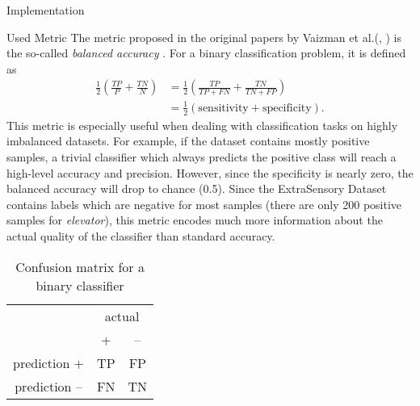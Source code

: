 \begin{section}{Implementation}
	\begin{subsection}{Used Metric}
		The metric proposed in the original papers by Vaizman et al.(\cite{Vaizman17}, \cite{Vaizman18}) is the so-called \emph{balanced accuracy} \cite{brodersen2010balanced}. For a binary classification problem, it is defined as
		\begin{equation}
			\begin{split}
				\frac{1}{2} \left(\frac{TP}{P} + \frac{TN}{N}\right) & = \frac{1}{2} \left(\frac{TP}{TP + FN} + \frac{TN}{TN + FP}\right)\\
				& = \frac{1}{2} \left(\text{sensitivity} + \text{specificity}\right).
			\end{split}
		\end{equation}
		This metric is especially useful when dealing with classification tasks on highly imbalanced datasets. For example, if the dataset contains mostly positive samples, a trivial classifier which always predicts the positive class will reach a high-level accuracy and precision. However, since the specificity is nearly zero, the balanced accuracy will drop to chance (0.5). Since the ExtraSensory Dataset contains labels which are negative for most samples (there are only 200 positive samples for \emph{elevator}), this metric encodes much more information about the actual quality of the classifier than standard accuracy.
		\begin{table}[H]
			\begin{center} 
				\begin{tabular}{c|c|c|}
					& \multicolumn{2}{c|}{actual} \\
					& +& -- \\
					\midrule
					prediction + & TP & FP \\
					\midrule
					prediction -- & FN & TN \\
					\bottomrule
				\end{tabular}
			\end{center}
			\caption{Confusion matrix for a binary classifier}
		\end{table}

\end{subsection}
\end{section}
